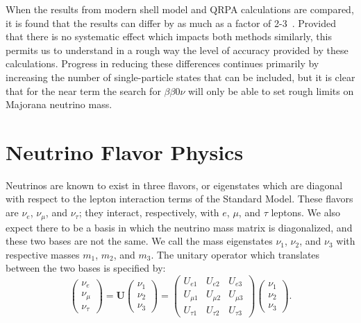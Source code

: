 When the results from modern shell model and QRPA calculations are compared, it is found that the results can differ by as much as a factor of 2-3~\cite{RMPbb0n}.  Provided that there is no systematic effect which impacts both methods similarly, this permits us to understand in a rough way the level of accuracy provided by these calculations.  Progress in reducing these differences continues primarily by increasing the number of single-particle states that can be included, but it is clear that for the near term the search for $\beta\beta 0\nu$ will only be able to set rough limits on Majorana neutrino mass.

\section{Neutrino Flavor Physics}\label{sec:NeutrinoFlavorPhysics}

Neutrinos are known to exist in three flavors, or eigenstates which are diagonal with respect to the lepton interaction terms of the Standard Model.  These flavors are $\nu_e$, $\nu_\mu$, and $\nu_\tau$; they interact, respectively, with $e$, $\mu$, and $\tau$ leptons.  We also expect there to be a basis in which the neutrino mass matrix is diagonalized, and these two bases are not the same.  We call the mass eigenstates $\nu_1$, $\nu_2$, and $\nu_3$ with respective masses $m_1$, $m_2$, and $m_3$.  The unitary operator which translates between the two bases is specified by:
\begin{equation} \label{eqn:ShortDefinitionOfU}
\begin{pmatrix} \nu_e \\ \nu_\mu \\ \nu_\tau \end{pmatrix}
=
\mathbf{U}
\begin{pmatrix} \nu_1 \\ \nu_2 \\ \nu_3 \end{pmatrix}
=
\begin{pmatrix}
U_{e1} & U_{e2} & U_{e3} \\
U_{\mu1} & U_{\mu2} & U_{\mu3} \\
U_{\tau1} & U_{\tau2} & U_{\tau3}
\end{pmatrix}
\begin{pmatrix} \nu_1 \\ \nu_2 \\ \nu_3 \end{pmatrix}.
\end{equation}

